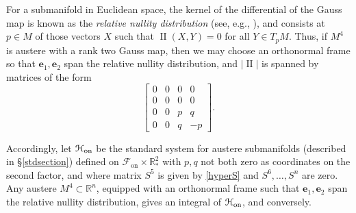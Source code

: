 \documentclass[12pt,reqno]{amsart}
\theoremstyle{definition}
\theoremstyle{remark}
\begin{document}
For a submanifold in Euclidean space, the kernel of the differential of the Gauss map is known as the
{\em relative nullity distribution} (see, e.g., \cite{Chen}), and consists at $p\in M$ of those
vectors $X$ such that ${\operatorname{II}}(X,Y)=0$ for all $Y\in T_pM$.  Thus, if $M^4$ is austere with a rank two Gauss map,
then we may choose an orthonormal frame so that ${\mathbf e}_1, {\mathbf e}_2$ span the relative nullity distribution, and
$|{\operatorname{II}}|$ is spanned by matrices of the form
\begin{equation}\label{hyperS}
\begin{bmatrix}0 & 0 & 0 & 0 \\0 & 0 & 0 & 0 \\0 & 0 & p & q \\0 & 0 & q & -p \end{bmatrix}.
\end{equation}

Accordingly, let ${{{\EuScript H}}_{\operatorname{on}}}$ be the standard system for austere submanifolds
(described in \S\ref{stdsection}) defined on ${{\mathscr F}_{\operatorname{on}}} \times {\mathbb R}_*^2$ with $p,q$ not both zero
as coordinates on the second factor,
and where matrix $S^5$ is given by \eqref{hyperS} and $S^6, \ldots, S^n$ are zero.
Any austere $M^4 \subset {\mathbb R}^n$, equipped with an orthonormal frame such that ${\mathbf e}_1,{\mathbf e}_2$ span the
relative nullity distribution, gives an integral of ${{{\EuScript H}}_{\operatorname{on}}}$, and conversely.
\end{document}
